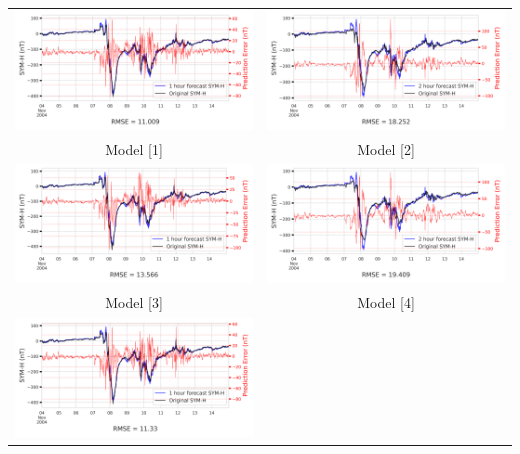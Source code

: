 \documentclass[draft,sw]{agutexSI2019}
\begin{document}
\begin{table}
\centering
\begin{tabular}{cc}
\includegraphics[width=0.49\linewidth]{paper_plots/1h_swics/1h_swics_storm_37.png}
&
\includegraphics[width=0.49\linewidth]{paper_plots/2h_swics/2h_swics_storm_37.png}
\\
Model [1] & Model [2]
\vspace*{12pt}
\\
\includegraphics[width=0.49\linewidth]{paper_plots/1h_no_swics/1h_no_swics_storm_37.png}
&
\includegraphics[width=0.49\linewidth]{paper_plots/2h_no_swics/2h_no_swics_storm_37.png}
\\
Model [3] & Model [4]
\vspace*{12pt}
\\
\includegraphics[width=0.49\linewidth]{paper_plots/1h_swics_model_on_no_swics/1h_swics_model_on_no_swics_storm_37.png}

\end{tabular}
\end{table}
\end{document}
